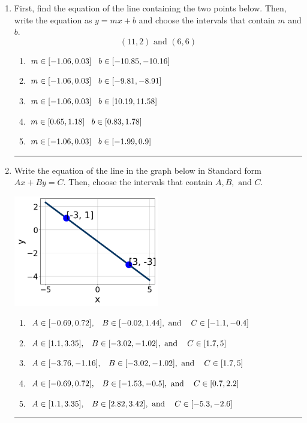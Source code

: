 \documentclass[14pt]{extbook}
\newcommand{\litem}[1]{\item#1\hspace*{-1cm}\rule{\textwidth}{0.4pt}}
\begin{document}
\begin{enumerate}
{\begin{enumerate}[label=\Alph*.]
\end{enumerate} }
\litem{
First, find the equation of the line containing the two points below. Then, write the equation as $ y=mx+b $ and choose the intervals that contain $m$ and $b$.\[ (11, 2) \text{ and } (6, 6) \]\begin{enumerate}[label=\Alph*.]
\item \( m \in [-1.06, 0.03] \hspace*{3mm} b \in [-10.85, -10.16] \)
\item \( m \in [-1.06, 0.03] \hspace*{3mm} b \in [-9.81, -8.91] \)
\item \( m \in [-1.06, 0.03] \hspace*{3mm} b \in [10.19, 11.58] \)
\item \( m \in [0.65, 1.18] \hspace*{3mm} b \in [0.83, 1.78] \)
\item \( m \in [-1.06, 0.03] \hspace*{3mm} b \in [-1.99, 0.9] \)

\end{enumerate} }
\litem{
Write the equation of the line in the graph below in Standard form $Ax+By=C$. Then, choose the intervals that contain $A, B, \text{ and } C$.
\begin{center}
    \includegraphics[width=0.5\textwidth]{../Figures/linearGraphToStandardCopyA.png}
\end{center}
\begin{enumerate}[label=\Alph*.]
\item \( A \in [-0.69, 0.72], \hspace{3mm} B \in [-0.02, 1.44], \text{ and } \hspace{3mm} C \in [-1.1, -0.4] \)
\item \( A \in [1.1, 3.35], \hspace{3mm} B \in [-3.02, -1.02], \text{ and } \hspace{3mm} C \in [1.7, 5] \)
\item \( A \in [-3.76, -1.16], \hspace{3mm} B \in [-3.02, -1.02], \text{ and } \hspace{3mm} C \in [1.7, 5] \)
\item \( A \in [-0.69, 0.72], \hspace{3mm} B \in [-1.53, -0.5], \text{ and } \hspace{3mm} C \in [0.7, 2.2] \)
\item \( A \in [1.1, 3.35], \hspace{3mm} B \in [2.82, 3.42], \text{ and } \hspace{3mm} C \in [-5.3, -2.6] \)


\end{enumerate}}
\end{enumerate}
\end{document}
